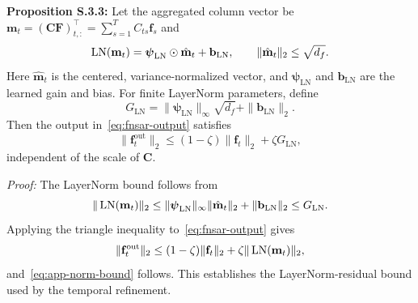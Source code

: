 \textbf{Proposition S.3.3:} Let the aggregated column vector be
\(\mathbf m_t=(\mathbf C\mathbf F)_{t,:}^{\top}
=\sum_{s=1}^{T}C_{ts}\mathbf f_s\) and
\begin{equation*}
\operatorname{LN}(\mathbf m_t)
=\boldsymbol{\psi}_{\mathrm{LN}}\odot\hat{\mathbf m}_t
+\mathbf b_{\mathrm{LN}},
\qquad
\|\hat{\mathbf m}_t\|_2\leq\sqrt{d_f}.
\end{equation*}
Here \(\hat{\mathbf m}_t\) is the centered, variance-normalized vector, and \(\boldsymbol\psi_{\mathrm{LN}}\) and \(\mathbf b_{\mathrm{LN}}\) are the learned gain and bias. For finite LayerNorm parameters, define
\begin{equation*}
G_{\mathrm{LN}}
=\|\boldsymbol{\psi}_{\mathrm{LN}}\|_\infty\sqrt{d_f}
+\|\mathbf b_{\mathrm{LN}}\|_2.
\end{equation*}
Then the output in~\eqref{eq:fnsar-output} satisfies
\begin{equation}
\|\mathbf f_t^{\mathrm{out}}\|_2
\leq(1-\zeta)\|\mathbf f_t\|_2+\zeta G_{\mathrm{LN}},
\label{eq:app-norm-bound}
\end{equation}
independent of the scale of \(\mathbf C\).

\emph{Proof:} The LayerNorm bound follows from
\begin{equation*}
\|\operatorname{LN}(\mathbf m_t)\|_2
\leq\|\boldsymbol{\psi}_{\mathrm{LN}}\|_\infty
\|\hat{\mathbf m}_t\|_2+\|\mathbf b_{\mathrm{LN}}\|_2
\leq G_{\mathrm{LN}}.
\end{equation*}
Applying the triangle inequality to~\eqref{eq:fnsar-output} gives
\begin{equation*}
\|\mathbf f_t^{\mathrm{out}}\|_2
\leq(1-\zeta)\|\mathbf f_t\|_2
+\zeta\|\operatorname{LN}(\mathbf m_t)\|_2,
\end{equation*}
and~\eqref{eq:app-norm-bound} follows. This establishes the LayerNorm-residual bound used by the temporal refinement.
